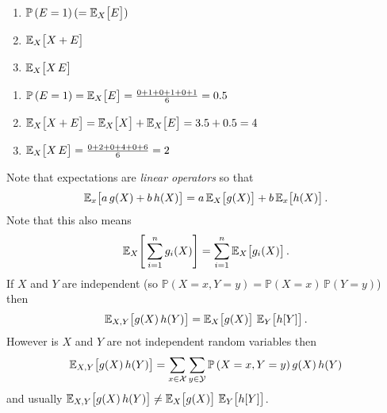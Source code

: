 \documentclass{sotonExamBoxes}    %
\newcommand{\Prob}[1]{\mathbb{P}\left(#1\right)}
\newcommand{\av}[2][\,]{\mathbb{E}_{#1}\!\left[ {\strut #2} \right]}
\begin{document}
\begin{question}{10}
\begin{qparts}
{\begin{enumerate}
      \item $\Prob{E=1} (= \av[X]{E})$
      \item $\av[X]{X + E}$
      \item $\av[X]{X\,E}$
      \end{enumerate}
    }{}
    \begin{answer}
      \begin{enumerate}
      \item $\Prob{E=1} = \av[X]{E} = \frac{0+1+0+1+0+1}{6} = 0.5$
      \item $\av[X]{X + E} = \av[X]{X} + \av[X]{E} = 3.5 + 0.5 = 4$
      \item $\av[X]{X\,E} = \frac{0 +2 + 0 +4 +0 +6}{6} = 2$
      \end{enumerate}
    \end{answer}
    \end{qparts}
\end{question}
\begin{answer}
  Note that expectations are \textit{linear operators} so that
  \begin{align*}
    \av[x]{a\,g(X) + b\,h(X)} = a\,\av[X]{g(X)} + b\,\av[x]{h(X)}.
  \end{align*}
  Note that this also means
  \begin{align*}
    \av[X]{\sum_{i=1}^n g_i(X)} = \sum_{i=1}^n \av[X]{g_i(X)}.
  \end{align*}
  If $X$ and $Y$ are independent (so $\Prob{X=x, Y=y}=
  \Prob{X=x}\,\Prob{Y=y}$) then
  \begin{align*}
    \av[X,Y]{g(X)\, h(Y)} = \av[X]{g(X)} \, \av[Y]{h[Y]}.
  \end{align*}
  However is $X$ and $Y$ are not independent random variables then
   \begin{align*}
    \av[X,Y]{g(X)\, h(Y)} = \sum_{x\in\mathcal{X}}
     \sum_{y\in\mathcal{Y}} \Prob{X=x,Y=y} g(X)\, h(Y)
   \end{align*}
   and usually $\av[X,Y]{g(X)\, h(Y)} \neq \av[X]{g(X)} \, \av[Y]{h[Y]}$.
\end{answer}
\end{document}
